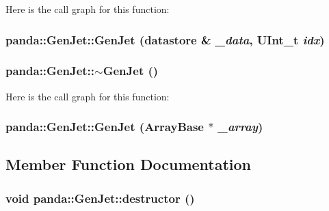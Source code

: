 Here is the call graph for this function:\hypertarget{classpanda_1_1GenJet_a3e47a5f2cb37c4377bee43b689f2bc60}{
\subsubsection[{GenJet}]{\setlength{\rightskip}{0pt plus 5cm}panda::GenJet::GenJet ({\bf datastore} \& {\em \_\-data}, \/  UInt\_\-t {\em idx})}}
\label{classpanda_1_1GenJet_a3e47a5f2cb37c4377bee43b689f2bc60}
\hypertarget{classpanda_1_1GenJet_ab92fb5378518bad26b16e55697e099c5}{
\subsubsection[{$\sim$GenJet}]{\setlength{\rightskip}{0pt plus 5cm}panda::GenJet::$\sim$GenJet ()}}
\label{classpanda_1_1GenJet_ab92fb5378518bad26b16e55697e099c5}


Here is the call graph for this function:\hypertarget{classpanda_1_1GenJet_a0725bef4f85c6ecf0cfb57ed149294bb}{
\subsubsection[{GenJet}]{\setlength{\rightskip}{0pt plus 5cm}panda::GenJet::GenJet ({\bf ArrayBase} $\ast$ {\em \_\-array})}}
\label{classpanda_1_1GenJet_a0725bef4f85c6ecf0cfb57ed149294bb}


\subsection{Member Function Documentation}
\hypertarget{classpanda_1_1GenJet_a4a10379464d97681df56ba78c59d9ec9}{
\subsubsection[{destructor}]{\setlength{\rightskip}{0pt plus 5cm}void panda::GenJet::destructor ()}}
\label{classpanda_1_1GenJet_a4a10379464d97681df56ba78c59d9ec9}


